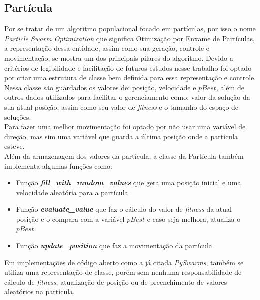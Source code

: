 \subsection{Partícula}
Por se tratar de um algoritmo populacional focado em partículas, por isso o nome \textit{Particle Swarm Optimization} que significa Otimização por Enxame de Partículas, a representação dessa entidade, assim como sua geração, controle e movimentação, se mostra um dos principais pilares do algoritmo. Devido a critérios de legibilidade e facilitação de futuros estudos nesse trabalho foi optado por criar uma estrutura de classe bem definida para essa representação e controle.
Nessa classe são guardados os valores de: posição, velocidade e $pBest$, além de outros dados utilizados para facilitar o gerenciamento como: valor da solução da sua atual posição, assim como seu valor de \textit{fitness} e o tamanho do espaço de soluções.\\
\indent Para fazer uma melhor movimentação foi optado por não usar uma variável de direção, mas sim uma variável que guarda a última posição onde a partícula esteve.\\
Além da armazenagem dos valores da partícula, a classe da Partícula também implementa algumas funções como:
\begin{itemize}
    \item Função \textbf{\textit{fill\_with\_random\_values}} que gera uma posição inicial e uma velocidade aleatória para a partícula.

    \item Função \textbf{\textit{evaluate\_value}} que faz o cálculo do valor de \textit{fitness} da atual posição e o compara com a variável $pBest$ e caso seja melhora, atualiza o $pBest$.

    \item Função \textbf{\textit{update\_position}} que faz a movimentação da partícula.
\end{itemize}

Em implementações de código aberto como a já citada \textit{PySwarms}, também se utiliza uma representação de classe, porém sem nenhuma responsabilidade de cálculo de \textit{fitness}, atualização de posição ou de preenchimento de valores aleatórios na partícula.


